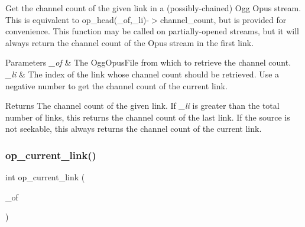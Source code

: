 Get the channel count of the given link in a (possibly-\/chained) Ogg Opus stream. This is equivalent to {\ttfamily op\+\_\+head(\+\_\+of,\+\_\+li)-\/$>$channel\+\_\+count}, but is provided for convenience. This function may be called on partially-\/opened streams, but it will always return the channel count of the Opus stream in the first link. 
\begin{DoxyParams}{Parameters}
{\em \+\_\+of} & The {\ttfamily Ogg\+Opus\+File} from which to retrieve the channel count. \\
\hline
{\em \+\_\+li} & The index of the link whose channel count should be retrieved. Use a negative number to get the channel count of the current link. \\
\hline
\end{DoxyParams}
\begin{DoxyReturn}{Returns}
The channel count of the given link. If {\itshape \+\_\+li} is greater than the total number of links, this returns the channel count of the last link. If the source is not seekable, this always returns the channel count of the current link. 
\end{DoxyReturn}
\mbox{\label{group__stream__info_gabd97a260a6740ea7c2c59ca9ecd592bf}} 
\subsubsection{\texorpdfstring{op\+\_\+current\+\_\+link()}{op\_current\_link()}}
{\footnotesize\ttfamily int op\+\_\+current\+\_\+link (\begin{DoxyParamCaption}\item[{\hyperlink{zconf_8h_a2c212835823e3c54a8ab6d95c652660e}{const} Ogg\+Opus\+File $\ast$}]{\+\_\+of }\end{DoxyParamCaption})}

